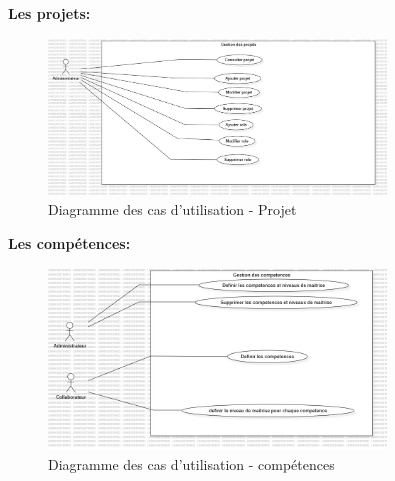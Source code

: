 \documentclass{article}
\begin{document}
                \textbf{Les projets:}
                \begin{figure}[h!]
                    \centering
                    \includegraphics[width=0.8\textwidth]{assets/diagrammes/jpg/Model6!UseCaseProject_5.jpg}
                    \caption{Diagramme des cas d'utilisation - Projet}
                \end{figure}
                \FloatBarrier
                \newpage
                \textbf{Les compétences:}
                \begin{figure}[h!]
                    \centering
                    \includegraphics[width=0.8\textwidth]{assets/diagrammes/jpg/Model7!UseCaseSkills_6.jpg}
                    \caption{Diagramme des cas d'utilisation - compétences}
                \end{figure}
                \FloatBarrier
                \newpage
\end{document}
